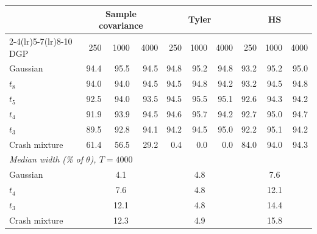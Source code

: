 \begin{tabular}{lrrrrrrrrr}
\toprule
 & \multicolumn{3}{c}{Sample covariance} & \multicolumn{3}{c}{Tyler} & \multicolumn{3}{c}{HS} \\
\cmidrule(lr){2-4}\cmidrule(lr){5-7}\cmidrule(lr){8-10}
DGP & 250 & 1000 & 4000 & 250 & 1000 & 4000 & 250 & 1000 & 4000 \\
\midrule
Gaussian & 94.4 & 95.5 & 94.5 & 94.8 & 95.2 & 94.8 & 93.2 & 95.2 & 95.0 \\
$t_8$ & 94.0 & 94.0 & 94.5 & 94.5 & 94.8 & 94.2 & 93.2 & 94.5 & 94.8 \\
$t_5$ & 92.5 & 94.0 & 93.5 & 94.5 & 95.5 & 95.1 & 92.6 & 94.3 & 94.2 \\
$t_4$ & 91.9 & 93.9 & 94.5 & 94.6 & 95.7 & 94.2 & 92.7 & 95.0 & 94.7 \\
$t_3$ & 89.5 & 92.8 & 94.1 & 94.2 & 94.5 & 95.0 & 92.2 & 95.1 & 94.2 \\
Crash mixture & 61.4 & 56.5 & 29.2 & 0.4 & 0.0 & 0.0 & 84.0 & 94.0 & 94.3 \\
\midrule
\multicolumn{10}{l}{\emph{Median width (\% of $\theta$), $T=4000$}} \\
Gaussian & \multicolumn{3}{c}{4.1} & \multicolumn{3}{c}{4.8} & \multicolumn{3}{c}{7.6} \\
$t_4$ & \multicolumn{3}{c}{7.6} & \multicolumn{3}{c}{4.8} & \multicolumn{3}{c}{12.1} \\
$t_3$ & \multicolumn{3}{c}{12.1} & \multicolumn{3}{c}{4.8} & \multicolumn{3}{c}{14.4} \\
Crash mixture & \multicolumn{3}{c}{12.3} & \multicolumn{3}{c}{4.9} & \multicolumn{3}{c}{15.8} \\
\bottomrule
\end{tabular}